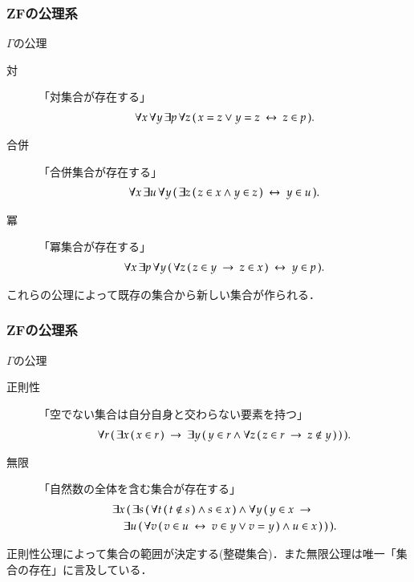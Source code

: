 \documentclass[dvipdfmx,10pt,notheorems]{beamer}
\theoremstyle{definition}
\newcommand{\rarrow}{\hspace{0.25em}\rightarrow\hspace{0.25em}} %
\newcommand{\lrarrow}{\hspace{0.25em}\leftrightarrow\hspace{0.25em}} %
\begin{document}
\begin{frame}\frametitle{{\bf ZF}の公理系}
	\begin{alertblock}{$\Gamma$の公理}
		\begin{description}
			\item[対] 「対集合が存在する」
				\begin{align}
					\forall x\, \forall y\, \exists p\, \forall z\, (\, x = z \vee y = z \lrarrow z \in p\, ).
				\end{align}
			\item[合併] 「合併集合が存在する」
				\begin{align}
					\forall x\, \exists u\, \forall y\, (\, \exists z\, (\, z \in x \wedge y \in z\, ) \lrarrow y \in u\, ).
				\end{align}
			\item[冪] 「冪集合が存在する」
				\begin{align}
					\forall x\, \exists p\, \forall y\, (\, \forall z\, (\, z \in y \rarrow z \in x\, ) 
					\lrarrow y \in p\, ).
				\end{align}
		\end{description}
	\end{alertblock}
	これらの公理によって既存の集合から新しい集合が作られる．
\end{frame}

\begin{frame}\frametitle{{\bf ZF}の公理系}
	\begin{alertblock}{$\Gamma$の公理}
		\begin{description}
			\item[正則性] 「空でない集合は自分自身と交わらない要素を持つ」
				\begin{align}
					\forall r\, (\, \exists x\, (\, x \in r\, ) \rarrow
					\exists y\, (\, y \in r \wedge \forall z\, (\, z \in r \rarrow
					z \notin y\, )\, )\, ).
				\end{align}
			\item[無限] 「自然数の全体を含む集合が存在する」
				\begin{align}
					&\exists x\, (\, \exists s\, (\, \forall t\, (\, t \notin s\, ) \wedge s \in x\, ) 
					\wedge \forall y\, (\, y \in x \rarrow \\
					&\quad \exists u\, (\, \forall v\, (\, v \in u \lrarrow v \in y \vee v = y\, ) 
					\wedge u \in x\, )\, )\, ).
				\end{align}
		\end{description}
	\end{alertblock}
	正則性公理によって集合の範囲が決定する(整礎集合)．また無限公理は唯一「集合の存在」に言及している．
\end{frame}
\end{document}
